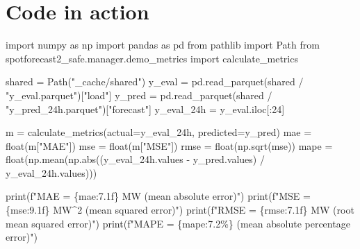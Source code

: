\documentclass[
  english,
  letterpaper,
]{scrbook}
\newenvironment{Shaded}{\begin{snugshade}}{\end{snugshade}}
\newcommand{\BuiltInTok}[1]{\textcolor[rgb]{0.00,0.23,0.31}{#1}}
\newcommand{\DecValTok}[1]{\textcolor[rgb]{0.68,0.00,0.00}{#1}}
\newcommand{\ImportTok}[1]{\textcolor[rgb]{0.00,0.46,0.62}{#1}}
\newcommand{\NormalTok}[1]{\textcolor[rgb]{0.00,0.23,0.31}{#1}}
\newcommand{\OperatorTok}[1]{\textcolor[rgb]{0.37,0.37,0.37}{#1}}
\newcommand{\SpecialCharTok}[1]{\textcolor[rgb]{0.37,0.37,0.37}{#1}}
\newcommand{\SpecialStringTok}[1]{\textcolor[rgb]{0.13,0.47,0.30}{#1}}
\newcommand{\StringTok}[1]{\textcolor[rgb]{0.13,0.47,0.30}{#1}}
\begin{document}
\section{Code in action}\label{code-in-action-5}

\protect{}\label{load-and-measure}
\begin{Shaded}
\begin{Highlighting}[]
\ImportTok{import}\NormalTok{ numpy }\ImportTok{as}\NormalTok{ np}
\ImportTok{import}\NormalTok{ pandas }\ImportTok{as}\NormalTok{ pd}
\ImportTok{from}\NormalTok{ pathlib }\ImportTok{import}\NormalTok{ Path}
\ImportTok{from}\NormalTok{ spotforecast2\_safe.manager.demo\_metrics }\ImportTok{import}\NormalTok{ calculate\_metrics}

\NormalTok{shared }\OperatorTok{=}\NormalTok{ Path(}\StringTok{"\_cache/shared"}\NormalTok{)}
\NormalTok{y\_eval }\OperatorTok{=}\NormalTok{ pd.read\_parquet(shared }\OperatorTok{/} \StringTok{"y\_eval.parquet"}\NormalTok{)[}\StringTok{"load"}\NormalTok{]}
\NormalTok{y\_pred }\OperatorTok{=}\NormalTok{ pd.read\_parquet(shared }\OperatorTok{/} \StringTok{"y\_pred\_24h.parquet"}\NormalTok{)[}\StringTok{"forecast"}\NormalTok{]}
\NormalTok{y\_eval\_24h }\OperatorTok{=}\NormalTok{ y\_eval.iloc[:}\DecValTok{24}\NormalTok{]}

\NormalTok{m }\OperatorTok{=}\NormalTok{ calculate\_metrics(actual}\OperatorTok{=}\NormalTok{y\_eval\_24h, predicted}\OperatorTok{=}\NormalTok{y\_pred)}
\NormalTok{mae  }\OperatorTok{=} \BuiltInTok{float}\NormalTok{(m[}\StringTok{"MAE"}\NormalTok{])}
\NormalTok{mse  }\OperatorTok{=} \BuiltInTok{float}\NormalTok{(m[}\StringTok{"MSE"}\NormalTok{])}
\NormalTok{rmse }\OperatorTok{=} \BuiltInTok{float}\NormalTok{(np.sqrt(mse))}
\NormalTok{mape }\OperatorTok{=} \BuiltInTok{float}\NormalTok{(np.mean(np.}\BuiltInTok{abs}\NormalTok{((y\_eval\_24h.values }\OperatorTok{{-}}\NormalTok{ y\_pred.values) }\OperatorTok{/}\NormalTok{ y\_eval\_24h.values)))}

\BuiltInTok{print}\NormalTok{(}\SpecialStringTok{f"MAE  = }\SpecialCharTok{\{}\NormalTok{mae}\SpecialCharTok{:7.1f\}}\SpecialStringTok{   MW   (mean absolute error)"}\NormalTok{)}
\BuiltInTok{print}\NormalTok{(}\SpecialStringTok{f"MSE  = }\SpecialCharTok{\{}\NormalTok{mse}\SpecialCharTok{:9.1f\}}\SpecialStringTok{   MW\^{}2 (mean squared error)"}\NormalTok{)}
\BuiltInTok{print}\NormalTok{(}\SpecialStringTok{f"RMSE = }\SpecialCharTok{\{}\NormalTok{rmse}\SpecialCharTok{:7.1f\}}\SpecialStringTok{   MW   (root mean squared error)"}\NormalTok{)}
\BuiltInTok{print}\NormalTok{(}\SpecialStringTok{f"MAPE = }\SpecialCharTok{\{}\NormalTok{mape}\SpecialCharTok{:7.2\%\}}\SpecialStringTok{        (mean absolute percentage error)"}\NormalTok{)}
\end{Highlighting}
\end{Shaded}
\end{document}
